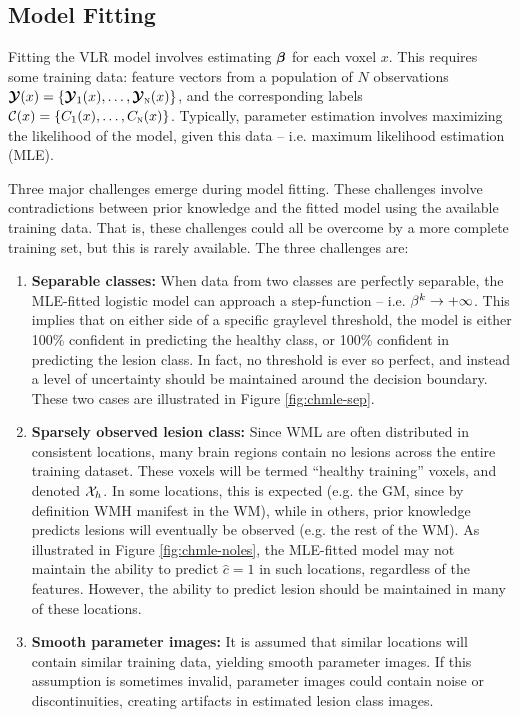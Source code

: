 \subsection{Model Fitting}\label{ss:modelfitting}
Fitting the VLR model involves estimating $\bm{\beta}$ for each voxel $x$.
This requires some training data: feature vectors from a population of $N$ observations $\bm{\mathcal{Y}}(x) = \{\bm{\mathcal{Y}}_1(x),\dots,\bm{\mathcal{Y}}_{\textsc{n}}(x)\}$, and the corresponding labels $\mathcal{C}(x) = \{C_1(x),\dots,C_{\textsc{n}}(x)\}$.
Typically, parameter estimation involves maximizing the likelihood of the model, given this data -- i.e. maximum likelihood estimation (MLE).
\par
Three major challenges emerge during model fitting.
These challenges involve contradictions between prior knowledge and the fitted model using the available training data.
That is, these challenges could all be overcome by a more complete training set, but this is rarely available.
The three challenges are:
\begin{enumerate}
  \item \label{chmle:separable} \textbf{Separable classes:} 
  When data from two classes are perfectly separable, the MLE-fitted logistic model can approach a step-function -- i.e. $\beta^k\rightarrow+\infty$.
This implies that on either side of a specific graylevel threshold, the model is either 100\% confident in predicting the healthy class, or 100\% confident in predicting the lesion class.
In fact, no threshold is ever so perfect, and instead a level of uncertainty should be maintained around the decision boundary.
These two cases are illustrated in Figure \ref{fig:chmle-sep}.
  \item \label{chmle:sparse} \textbf{Sparsely observed lesion class:} 
  Since WML are often distributed in consistent locations, many brain regions contain no lesions across the entire training dataset.
These voxels will be termed ``healthy training'' voxels, and denoted $\mathcal{X}_{h}$.
In some locations, this is expected (e.g. the GM, since by definition WMH manifest in the WM), while in others, prior knowledge predicts lesions will eventually be observed (e.g. the rest of the WM).
As illustrated in Figure \ref{fig:chmle-noles}, the MLE-fitted model may not maintain the ability to predict $\hat{c} = 1$ in such locations, regardless of the features.
However, the ability to predict lesion should be maintained in many of these locations.
  \item \label{chmle:noisy} \textbf{Smooth parameter images:} 
  It is assumed that similar locations will contain similar training data, yielding smooth parameter images.
If this assumption is sometimes invalid, parameter images could contain noise or discontinuities, creating artifacts in estimated lesion class images.
\end{enumerate}

